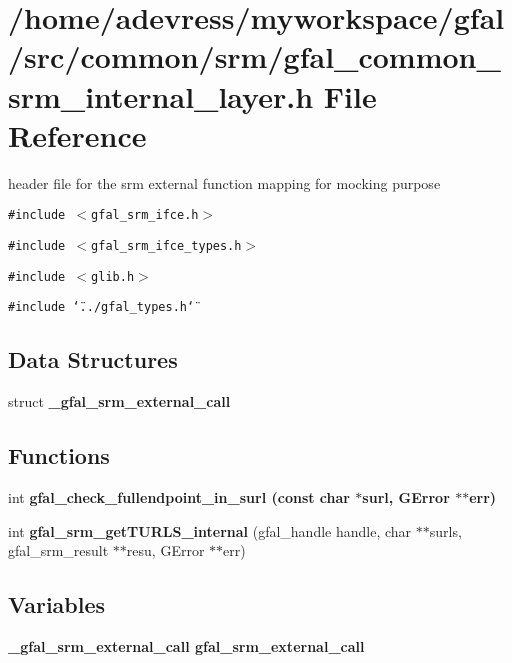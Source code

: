 \section{/home/adevress/myworkspace/gfal/src/common/srm/gfal\_\-common\_\-srm\_\-internal\_\-layer.h File Reference}
\label{gfal__common__srm__internal__layer_8h}
header file for the srm external function mapping for mocking purpose 

{\tt \#include $<$gfal\_\-srm\_\-ifce.h$>$}\par
{\tt \#include $<$gfal\_\-srm\_\-ifce\_\-types.h$>$}\par
{\tt \#include $<$glib.h$>$}\par
{\tt \#include \char`\"{}../gfal\_\-types.h\char`\"{}}\par
\subsection*{Data Structures}
\begin{CompactItemize}
\item 
struct \bf{\_\-gfal\_\-srm\_\-external\_\-call}
\end{CompactItemize}
\subsection*{Functions}
\begin{CompactItemize}
\item 
int \bf{gfal\_\-check\_\-fullendpoint\_\-in\_\-surl} (const char $\ast$surl, GError $\ast$$\ast$err)
\item 
int \textbf{gfal\_\-srm\_\-get\-TURLS\_\-internal} (gfal\_\-handle handle, char $\ast$$\ast$surls, gfal\_\-srm\_\-result $\ast$$\ast$resu, GError $\ast$$\ast$err)\label{gfal__common__srm__internal__layer_8h_07842f2edba0cfe563392ac479102b34}

\end{CompactItemize}
\subsection*{Variables}
\begin{CompactItemize}
\item 
\bf{\_\-gfal\_\-srm\_\-external\_\-call} \textbf{gfal\_\-srm\_\-external\_\-call}\label{gfal__common__srm__internal__layer_8h_67b12c7342043451fc5ce31b1a3d74fb}

\end{CompactItemize}


